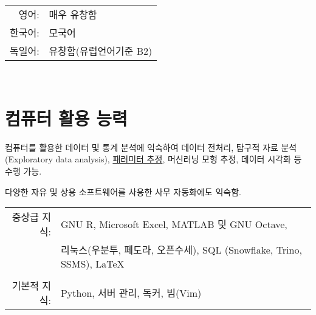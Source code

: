 \documentclass[a4paper]{article} %
\begin{document}
\begin{tabular}{rl}
\textsc{영어:} & 매우 유창함\\

\textsc{한국어:} & 모국어\\

\textsc{독일어:} & 유창함(유럽언어기준 B2)\\
\end{tabular}
\\
\section{컴퓨터 활용 능력}

컴퓨터를 활용한 데이터 및 통계 분석에 익숙하여
데이터 전처리, 탐구적 자료 분석(Exploratory data analysis),
\href{https://www.sciencedirect.com/topics/mathematics/classical-inference}{패러미터
추정}, 머신러닝 모형 추정, 데이터 시각화 등 수행 가능.

다양한 자유 및 상용 소프트웨어를 사용한 사무 자동화에도 익숙함.

\begin{tabular}{rl}
중상급 지식: & GNU R, Microsoft Excel, MATLAB 및 GNU Octave, \\
&리눅스(우분투, 페도라, 오픈수세), SQL (Snowflake, Trino, SSMS), \LaTeX
\\
\\
기본적 지식: & Python, 서버 관리, 독커, 빔(Vim)

\end{tabular}

%
%	
%	
\end{document}
